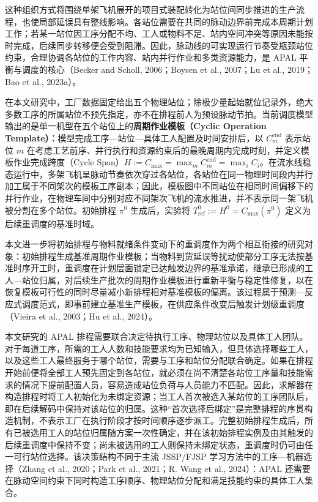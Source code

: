 \documentclass[journal,10pt]{IEEEtran}
\begin{document}
这种组织方式将围绕单架飞机展开的项目式装配转化为站位间同步推进的生产流程，也使局部延误具有整线影响。各站位需要在共同的脉动边界前完成本周期计划工作；若某一站位因工序分配不均、工人或物料不足、站内空间冲突等原因未能按时完成，后续同步转移便会受到阻滞。因此，脉动线的可实现运行节奏受瓶颈站位约束，合理协调各站位的工作内容、站内并行作业和多类资源能力，是 APAL 平衡与调度的核心（Becker and Scholl, 2006；Boysen et al., 2007；Lu et al., 2019；Bao et al., 2023a）。

在本文研究中，工厂数据固定给出五个物理站位；除极少量起始就位记录外，绝大多数工序的所属站位不预先指定，亦不在排程前人为预设脉动节拍。当前调度模型输出的是单一机型在五个站位上的\textbf{周期作业模板（Cyclic Operation Template）}：模型完成工序---站位---具体工人配置及时间安排后，以 \(C_m^{\mathrm{end}}\) 表示站位 \(m\) 在考虑工艺前序、并行执行和资源约束后的最晚周期内完成时刻，并定义模板作业完成跨度（Cycle Span）\(H := C_{\max} = \max_m C_m^{\mathrm{end}} = \max_i C_i\)。在流水线稳态运行中，多架飞机呈脉动节奏依次穿过各站位，各站位在同一物理时间段内并行加工属于不同架次的模板工序副本；因此，模板图中不同站位在相同时间偏移下的并行作业，在物理车间中分别对应不同架次飞机的流水推进，并不表示同一架飞机被分割在多个站位。初始排程 \(\pi^0\) 生成后，实验将 \(T_{\mathrm{ref}}^0 := H^0 = C_{\max}(\pi^0)\) 定义为后续重调度的基准时域。

本文进一步将初始排程与物料就绪条件变动下的重调度作为两个相互衔接的研究对象：初始排程生成基准周期作业模板；当物料到货延误等扰动使部分工序无法按基准时序开工时，重调度在计划层面锁定已达触发边界的基准承诺，继承已形成的工人---站位归属，对后续生产批次的周期作业模板进行重新平衡与稳定性修复，以在恢复模板可行性的同时尽量减小新排程相对基准模板的偏离。该过程属于预测---反应式调度范式，即事前建立基准生产模板，在供应条件改变后触发计划级重调度（Vieira et al., 2003；Hu et al., 2024）。

本文研究的 APAL 排程需要联合决定待执行工序、物理站位以及具体工人团队。对于每道工序，所需的工人人数和技能要求均为已知输入，但具体选择哪些工人，以及这些工人最终服务于哪个站位，需要与工序和站位分配联合确定。如果在排程开始前便将全部工人预先固定到各站位，就必须在尚不清楚各站位工序量和技能需求的情况下提前配置人员，容易造成站位负荷与人员能力不匹配。因此，求解器在构造排程时将工人初始化为未绑定资源；当工人首次被选入某站位的工序团队后，即在后续解码中保持对该站位的归属。这种``首次选择后绑定''是完整排程的序贯构造机制，不表示工厂在执行阶段才按时间顺序逐步派工。完整初始排程生成后，所有已被选用工人的站位归属随方案一次性确定，并在该初始排程实例及由其触发的后续重调度中保持不变；尚未被选用的工人则保持未绑定状态，重调度时仍可由任一可行站位选择。该决策结构不同于主流 JSSP/FJSP 学习方法中的工序---机器选择（Zhang et al., 2020；Park et al., 2021；R. Wang et al., 2024）：APAL 还需要在脉动空间约束下同时构造工序顺序、物理站位分配和满足技能约束的具体工人集合。
\end{document}

